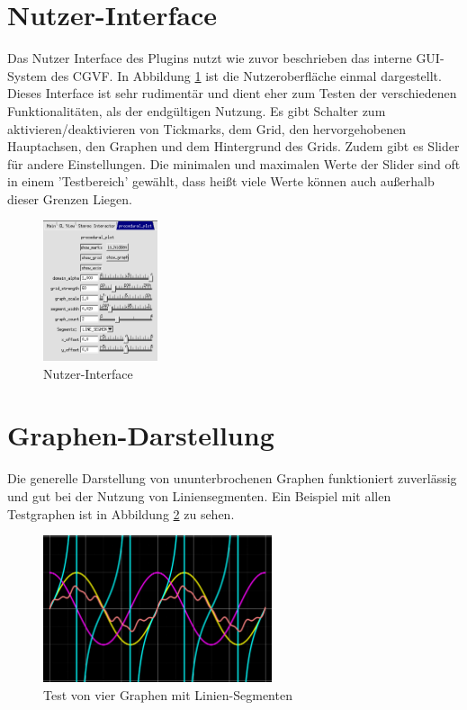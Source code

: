 \section{Nutzer-Interface}
Das Nutzer Interface des Plugins nutzt wie zuvor beschrieben das interne GUI-System des CGVF.
In Abbildung \ref{fig:ui} ist die Nutzeroberfläche einmal dargestellt.
Dieses Interface ist sehr rudimentär und dient eher zum Testen der verschiedenen Funktionalitäten, als der endgültigen Nutzung.
Es gibt Schalter zum aktivieren/deaktivieren von Tickmarks, dem Grid, den hervorgehobenen Hauptachsen, den Graphen und dem Hintergrund des Grids.
Zudem gibt es Slider für andere Einstellungen.
Die minimalen und maximalen Werte der Slider sind oft in einem 'Testbereich' gewählt, dass heißt viele Werte können auch außerhalb dieser Grenzen Liegen.
\begin{figure}[ht]
	\centering
	\includegraphics[width=0.3\textwidth]{fig/ui.png}
	\caption{Nutzer-Interface}
	\label{fig:ui}
\end{figure}
\FloatBarrier

\section{Graphen-Darstellung}
Die generelle Darstellung von ununterbrochenen Graphen funktioniert zuverlässig und gut bei der Nutzung von Liniensegmenten.
Ein Beispiel mit allen Testgraphen ist in Abbildung \ref{fig:all-graphs} zu sehen.
\begin{figure}[ht]
	\centering
	\includegraphics[width=0.6\textwidth]{fig/all-graphs.png}
	\caption{Test von vier Graphen mit Linien-Segmenten}
	\label{fig:all-graphs}
\end{figure}
\FloatBarrier

